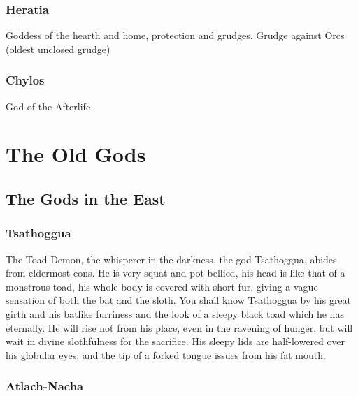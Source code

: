 \documentclass[a4paper]{style/dnd4e}
\begin{document}
\subsubsection*{Heratia} 
Goddess of the hearth and home, protection and grudges.
Grudge against Orcs (oldest unclosed grudge)  

\subsubsection*{Chylos}
God of the Afterlife  
  



\section*{The Old Gods}

\subsection*{The Gods in the East}

\subsubsection*{Tsathoggua}

The Toad-Demon, the whisperer in the darkness, the god Tsathoggua, abides from eldermost 
eons.  He is very squat and pot-bellied, his head is like that of a monstrous toad, his whole 
body is covered with short fur, giving a vague sensation of both the bat and the sloth. You 
shall know Tsathoggua by his great girth and his batlike 
furriness and the look of a sleepy black toad which he has eternally. He will rise not 
from his place, even in the ravening of hunger, but will wait in divine slothfulness for 
the sacrifice.   His sleepy lids are half-lowered over his globular eyes; and the tip of a 
forked tongue issues from his fat mouth.


\subsubsection*{Atlach-Nacha} 
\end{document}
